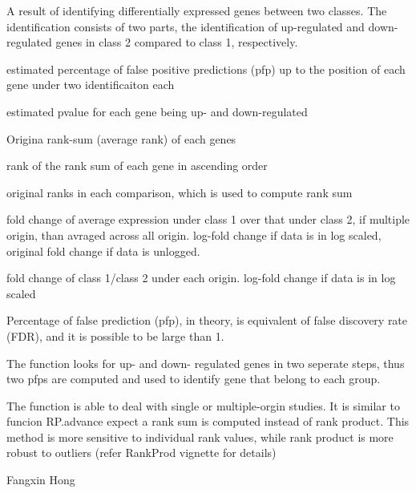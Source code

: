 \begin{Value}
A result of identifying differentially expressed 
genes between two classes. The identification consists of two parts,
the identification of  up-regulated  and down-regulated genes in class 2
compared to class 1, respectively. 

\begin{ldescription}
\item[\code{pfp}] estimated percentage of false positive predictions
(pfp) up to  the position of each gene under two 
identificaiton each
\item[\code{pval}] estimated pvalue for each gene being up- and down-regulated
\item[\code{RSs}] Origina rank-sum (average rank) of each genes
\item[\code{RSrank}] rank of the rank sum of each gene in ascending order
\item[\code{Orirank}] original ranks in each comparison, which is 
used to compute rank sum
\item[\code{AveFC}] fold change of average expression under class 1 over 
that under class 2, if multiple origin, than avraged 
across all origin. log-fold change if data is in log scaled, 
original fold change if data is unlogged. 
\item[\code{all.FC}] fold change of class 1/class 2 under each origin.
log-fold change if data is in log scaled
\end{ldescription}
\end{Value}
\begin{Note}\relax
Percentage of false prediction (pfp), in theory, is 
equivalent of false  discovery rate (FDR), and it is 
possible to be large than 1.

The function looks for up- and down- regulated genes in two
seperate steps, thus two pfps are computed and used to identify 
gene that belong to each group. 

The function is able to deal with single or multiple-orgin 
studies. It is similar to  funcion RP.advance expect a rank
sum is computed instead of rank product. This method 
is more sensitive to individual rank values, while rank 
product is more robust to 
outliers (refer RankProd vignette for details)
\end{Note}
\begin{Author}\relax
Fangxin Hong 
\end{Author}
\begin{SeeAlso}\relax
{}     
  
\end{SeeAlso}

